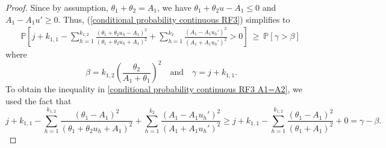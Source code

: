 \documentclass[twoside,11pt]{article}
\newcommand{\edit}[1]{{{#1}}}
\begin{document}
\begin{proof}
Since by assumption, $\theta_1 + \theta_2 = A_1$, we have $\theta_1+\theta_2 u-A_1 \leq  0 $ and $A_1 -A_1 u' \geq  0$. Thus,  (\ref{conditional probability continuous RF3}) simplifies to \edit{
\begin{align}
&\mathbb{P}\left[j + k_{1,1} - \sum_{h=1}^{k_{1,2}}\frac{(\theta_1+\theta_2 u_h-A_1)^2}{(\theta_1+\theta_2 u_h+A_1)^2} + \sum_{h=1}^{k_2}\frac{(A_1-A_1 u_h')^2}{(A_1+A_1 u_h')^2} > 0\right]%
\ \geq \ \mathbb{P}[\gamma > \beta]\label{conditional probability continuous RF3 A1=A2}
\end{align}
where $$\quad\beta = k_{1,2}\left(\frac{\theta_2}{A_1+\theta_1}\right)^2\quad \text{and} \quad\gamma = j+k_{1,1}.$$ 
To obtain the inequality in \eqref{conditional probability continuous RF3 A1=A2}, we used the fact that  $$j + k_{1,1} - \sum_{h=1}^{k_{1,2}}\frac{(\theta_1-A_1)^2}{(\theta_1+\theta_2 u_h+A_1)^2} + \sum_{h=1}^{k_2}\frac{(A_1-A_1 u_h')^2}{(A_1+A_1 u_h')^2} \geq j + k_{1,1} - \sum_{h=1}^{k_{1,2}}\frac{(\theta_1-A_1)^2}{(\theta_1+A_1)^2} + 0=\gamma-\beta.$$
}
%
%
%

\end{proof}
\end{document}
